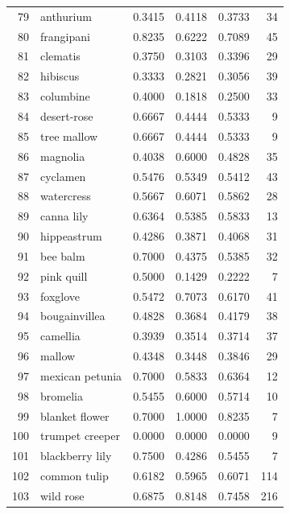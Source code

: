 \begin{longtable}{rlrrrr}
79 & anthurium & 0.3415 & 0.4118 & 0.3733 & 34 \\
80 & frangipani & 0.8235 & 0.6222 & 0.7089 & 45 \\
81 & clematis & 0.3750 & 0.3103 & 0.3396 & 29 \\
82 & hibiscus & 0.3333 & 0.2821 & 0.3056 & 39 \\
83 & columbine & 0.4000 & 0.1818 & 0.2500 & 33 \\
84 & desert-rose & 0.6667 & 0.4444 & 0.5333 & 9 \\
85 & tree mallow & 0.6667 & 0.4444 & 0.5333 & 9 \\
86 & magnolia & 0.4038 & 0.6000 & 0.4828 & 35 \\
87 & cyclamen & 0.5476 & 0.5349 & 0.5412 & 43 \\
88 & watercress & 0.5667 & 0.6071 & 0.5862 & 28 \\
89 & canna lily & 0.6364 & 0.5385 & 0.5833 & 13 \\
90 & hippeastrum & 0.4286 & 0.3871 & 0.4068 & 31 \\
91 & bee balm & 0.7000 & 0.4375 & 0.5385 & 32 \\
92 & pink quill & 0.5000 & 0.1429 & 0.2222 & 7 \\
93 & foxglove & 0.5472 & 0.7073 & 0.6170 & 41 \\
94 & bougainvillea & 0.4828 & 0.3684 & 0.4179 & 38 \\
95 & camellia & 0.3939 & 0.3514 & 0.3714 & 37 \\
96 & mallow & 0.4348 & 0.3448 & 0.3846 & 29 \\
97 & mexican petunia & 0.7000 & 0.5833 & 0.6364 & 12 \\
98 & bromelia & 0.5455 & 0.6000 & 0.5714 & 10 \\
99 & blanket flower & 0.7000 & 1.0000 & 0.8235 & 7 \\
100 & trumpet creeper & 0.0000 & 0.0000 & 0.0000 & 9 \\
101 & blackberry lily & 0.7500 & 0.4286 & 0.5455 & 7 \\
102 & common tulip & 0.6182 & 0.5965 & 0.6071 & 114 \\
103 & wild rose & 0.6875 & 0.8148 & 0.7458 & 216 \\
\end{longtable}
